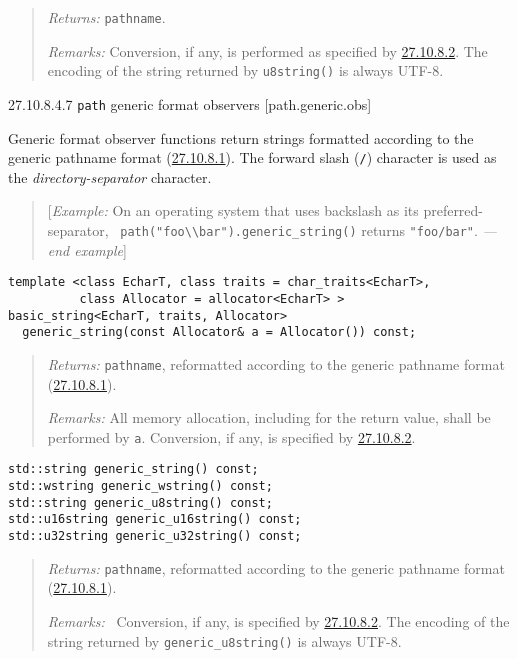 \begin{quote}
\emph{Returns:} \texttt{pathname}.

\emph{Remarks:} Conversion, if any, is performed as specified by
\hyperref[path.cvt]{27.10.8.2}. The encoding of the string returned by
\texttt{u8string()} is always UTF-8.
\end{quote}

27.10.8.4.7 \texttt{path} generic format observers
{[}path.generic.obs{]}

Generic format observer functions return strings formatted according to
the generic pathname format (\hyperref[path.generic]{27.10.8.1}). The
forward slash (\texttt{\textquotesingle{}/\textquotesingle{}}) character
is used as the \emph{directory-separator} character.

\begin{quote}
{[}\emph{Example:} On an operating system that uses backslash as its
preferred-separator,~
\texttt{path("foo\textbackslash{}\textbackslash{}bar").generic\_string()}
returns \texttt{"foo/bar"}. \emph{---end example}{]}
\end{quote}

\begin{verbatim}
template <class EcharT, class traits = char_traits<EcharT>,
          class Allocator = allocator<EcharT> >
basic_string<EcharT, traits, Allocator>
  generic_string(const Allocator& a = Allocator()) const;
\end{verbatim}

\begin{quote}
\emph{Returns:} \texttt{pathname}, reformatted according to the generic
pathname format (\hyperref[path.generic]{27.10.8.1}).

\emph{Remarks:} All memory allocation, including for the return value,
shall be performed by \texttt{a}. Conversion, if any, is specified by
\hyperref[path.cvt]{27.10.8.2}.
\end{quote}

\begin{verbatim}
std::string generic_string() const;
std::wstring generic_wstring() const;
std::string generic_u8string() const;
std::u16string generic_u16string() const;
std::u32string generic_u32string() const; 
\end{verbatim}

\begin{quote}
\emph{Returns:} \texttt{pathname}, reformatted according to the generic
pathname format (\hyperref[path.generic]{27.10.8.1}).

\emph{Remarks:}~ Conversion, if any, is specified by
\hyperref[path.cvt]{27.10.8.2}. The encoding of the string returned by
\texttt{generic\_u8string()} is always UTF-8.
\end{quote}

